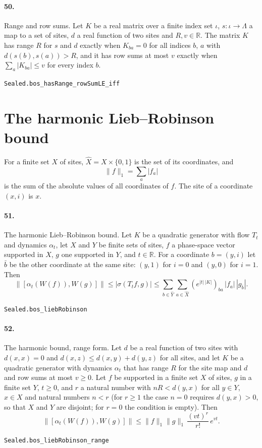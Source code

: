 \documentclass[11pt]{article}
\begin{document}
\paragraph{50.} Range and row sums. Let $K$ be a real matrix over a finite index set $\iota$, $s : \iota \to \Lambda$ a map to a set of sites, $d$ a real function of two sites and $R, v \in \mathbb R$. The matrix $K$ has range $R$ for $s$ and $d$ exactly when $K_{ba} = 0$ for all indices $b$, $a$ with $d(s(b), s(a)) > R$, and it has row sums at most $v$ exactly when $\sum_a |K_{ba}| \le v$ for every index $b$.\par{\footnotesize\texttt{Sealed.bos\_hasRange\_rowSumLE\_iff}}

\section*{The harmonic Lieb–Robinson bound}
For a finite set $X$ of sites, $\hat X = X \times \{0, 1\}$ is the set of its coordinates, and \[\|f\|_1 = \sum_a |f_a|\] is the sum of the absolute values of all coordinates of $f$. The site of a coordinate $(x, i)$ is $x$.

\paragraph{51.} The harmonic Lieb–Robinson bound. Let $K$ be a quadratic generator with flow $T_t$ and dynamics $\alpha_t$, let $X$ and $Y$ be finite sets of sites, $f$ a phase-space vector supported in $X$, $g$ one supported in $Y$, and $t \in \mathbb R$. For a coordinate $b = (y, i)$ let $\bar b$ be the other coordinate at the same site: $(y, 1)$ for $i = 0$ and $(y, 0)$ for $i = 1$. Then \[\|[\alpha_t(W(f)), W(g)]\| \le |\sigma(T_t f, g)| \le \sum_{b \in \hat Y} \sum_{a \in \hat X} (e^{|t|\,|K|})_{ba}\, |f_a|\, |g_{\bar b}|.\]\par{\footnotesize\texttt{Sealed.bos\_liebRobinson}}

\paragraph{52.} The harmonic bound, range form. Let $d$ be a real function of two sites with $d(x, x) = 0$ and $d(x, z) \le d(x, y) + d(y, z)$ for all sites, and let $K$ be a quadratic generator with dynamics $\alpha_t$ that has range $R$ for the site map and $d$ and row sums at most $v \ge 0$. Let $f$ be supported in a finite set $X$ of sites, $g$ in a finite set $Y$, $t \ge 0$, and $r$ a natural number with $n R < d(y, x)$ for all $y \in Y$, $x \in X$ and natural numbers $n < r$ (for $r \ge 1$ the case $n = 0$ requires $d(y, x) > 0$, so that $X$ and $Y$ are disjoint; for $r = 0$ the condition is empty). Then \[\|[\alpha_t(W(f)), W(g)]\| \le \|f\|_1 \|g\|_1\, \frac{(vt)^r}{r!}\, e^{vt}.\]\par{\footnotesize\texttt{Sealed.bos\_liebRobinson\_range}}
\end{document}
